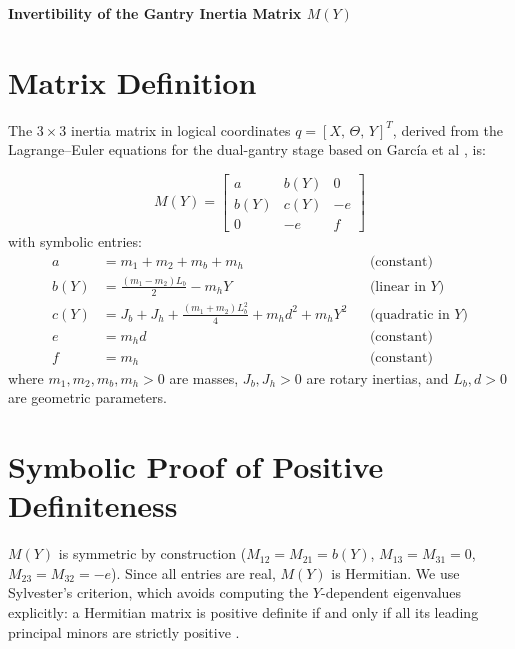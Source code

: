 \documentclass[11pt]{article}
\begin{document}
\begin{center}
    {\LARGE\bfseries Invertibility of the Gantry Inertia Matrix $M(Y)$}\\[0.5em]
\end{center}

\vspace{0.5em}

\section{Matrix Definition}

The $3\times3$ inertia matrix in logical coordinates $q = [X,\,\Theta,\,Y]^T$, derived from
the Lagrange--Euler equations for the dual-gantry stage based on García et al \cite{garcia2013model}, is:

\begin{equation}
    M(Y) = \begin{bmatrix} a & b(Y) & 0 \\ b(Y) & c(Y) & -e \\ 0 & -e & f \end{bmatrix}
\end{equation}
with symbolic entries:
\begin{align}
    a    &= m_1 + m_2 + m_b + m_h & &\text{(constant)}\\
    b(Y) &= \tfrac{(m_1 - m_2)L_b}{2} - m_h Y & &\text{(linear in } Y\text{)}\\
    c(Y) &= J_b + J_h + \tfrac{(m_1+m_2)L_b^2}{4} + m_h d^2 + m_h Y^2 & &\text{(quadratic in }Y\text{)}\\
    e    &= m_h d & &\text{(constant)}\\
    f    &= m_h & &\text{(constant)}
\end{align}
where $m_1, m_2, m_b, m_h > 0$ are masses, $J_b, J_h > 0$ are rotary inertias,
and $L_b, d > 0$ are geometric parameters.

\section{Symbolic Proof of Positive Definiteness}
 $M(Y)$ is symmetric by construction ($M_{12} = M_{21} = b(Y)$, $M_{13} = M_{31} = 0$, $M_{23} = M_{32} = -e$). Since all entries are real, $M(Y)$ is Hermitian. We use Sylvester's criterion, which avoids computing the $Y$-dependent eigenvalues explicitly: a Hermitian matrix is positive definite if and only if all its leading principal minors are strictly positive \cite{horn2012matrix}. 
\end{document}
